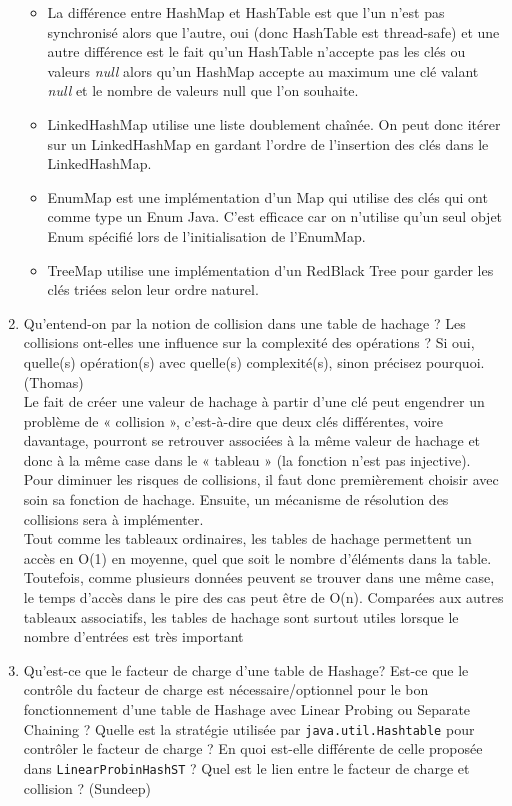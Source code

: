 \documentclass[11pt]{article}
\begin{document}
\begin{enumerate}
\begin{itemize}
\item La différence entre HashMap et HashTable est que l'un n'est pas synchronisé alors que l'autre, oui (donc HashTable est thread-safe) et une autre différence est le fait qu'un HashTable n'accepte pas les clés ou valeurs \textit{null} alors qu'un HashMap accepte au maximum une clé valant \textit{null} et le nombre de valeurs null que l'on souhaite.
\item LinkedHashMap utilise une liste doublement chaînée. On peut donc itérer sur un LinkedHashMap en gardant l'ordre de l'insertion des clés dans le LinkedHashMap.
\item EnumMap est une implémentation d'un Map qui utilise des clés qui ont comme type un Enum Java. C'est efficace car on n'utilise qu'un seul objet Enum spécifié lors de l'initialisation de l'EnumMap.
\item TreeMap utilise une implémentation d'un RedBlack Tree pour garder les clés triées selon leur ordre naturel.
\end{itemize}

\item Qu'entend-on par la notion de collision dans une table de hachage ? Les collisions ont-elles une influence sur la complexité des opérations ? Si oui, quelle(s) opération(s) avec quelle(s) complexité(s), sinon précisez pourquoi. (Thomas)\\

Le fait de créer une valeur de hachage à partir d'une clé peut engendrer un problème de « collision », c'est-à-dire que deux clés différentes, voire davantage, pourront se retrouver associées à la même valeur de hachage et donc à la même case dans le « tableau » (la fonction n'est pas injective). Pour diminuer les risques de collisions, il faut donc premièrement choisir avec soin sa fonction de hachage. Ensuite, un mécanisme de résolution des collisions sera à implémenter.\\
Tout comme les tableaux ordinaires, les tables de hachage permettent un accès en O(1) en moyenne, quel que soit le nombre d'éléments dans la table. Toutefois, comme plusieurs données peuvent se trouver dans une même case, le temps d'accès dans le pire des cas peut être de O(n). Comparées aux autres tableaux associatifs, les tables de hachage sont surtout utiles lorsque le nombre d'entrées est très important





\item Qu'est-ce que le facteur de charge d'une table de Hashage? Est-ce que le contrôle du facteur de charge est nécessaire/optionnel pour le bon fonctionnement d'une table de Hashage avec Linear Probing ou Separate Chaining ? Quelle est la stratégie utilisée par \texttt{java.util.Hashtable} pour contrôler le facteur de charge ? En quoi est-elle différente de celle proposée dans \texttt{LinearProbinHashST} ? Quel est le lien entre le facteur de charge et collision ? (Sundeep) \\



\end{enumerate}
\end{document}
